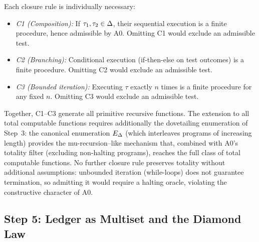 \begin{remark}
\label{rem:closure-minimality}
Each closure rule is individually necessary:
\begin{itemize}[nosep]
  \item \emph{C1 (Composition):} If $\tau_1, \tau_2 \in \Delta$, their
        sequential execution is a finite procedure, hence admissible by A0.
        Omitting C1 would exclude an admissible test.
  \item \emph{C2 (Branching):} Conditional execution
        (if-then-else on test outcomes) is a finite procedure.  Omitting
        C2 would exclude an admissible test.
  \item \emph{C3 (Bounded iteration):} Executing $\tau$ exactly $n$ times
        is a finite procedure for any fixed $n$.  Omitting C3 would exclude
        an admissible test.
\end{itemize}
Together, C1--C3 generate all primitive recursive functions.  The
extension to all total computable functions requires additionally the
dovetailing enumeration of Step~3: the canonical enumeration $E_\Delta$
(which interleaves programs of increasing length) provides the
mu-recursion--like mechanism that, combined with A0's totality filter
(excluding non-halting programs), reaches the full class of total
computable functions.  No further closure rule preserves totality without
additional assumptions: unbounded iteration (while-loops) does not
guarantee termination, so admitting it would require a halting oracle,
violating the constructive character of A0.
\end{remark}


\subsection{Step 5: Ledger as Multiset and the Diamond Law}\label{app:step5}

